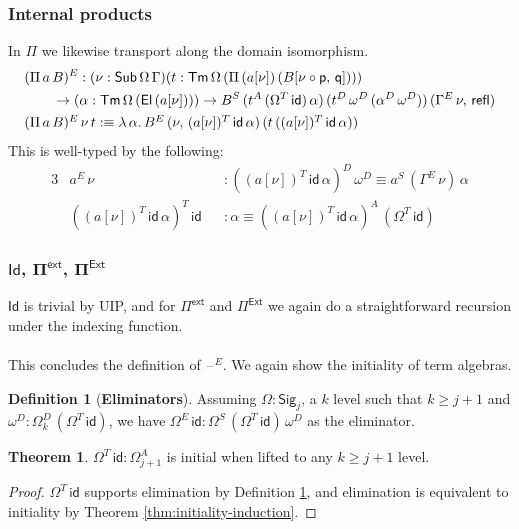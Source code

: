 \documentclass[12pt,a4paper,twoside,openany]{book}
\theoremstyle{remark}
\theoremstyle{definition}
\newtheorem{mydefinition}{Definition}
\theoremstyle{theorem}
\newtheorem{theorem}{Theorem}
\newcommand{\bs}[1]{\boldsymbol{#1}}
\newcommand{\refl}{\mathsf{refl}}
\newcommand{\id}{\mathsf{id}}
\newcommand{\Sub}{\mathsf{Sub}}
\newcommand{\Tm}{\mathsf{Tm}}
\newcommand{\El}{\mathsf{El}}
\newcommand{\Id}{\mathsf{Id}}
\newcommand{\blank}{\mathord{\hspace{1pt}\text{--}\hspace{1pt}}}
\newcommand{\Pie}{\Pi^{\mathsf{Ext}}}
\newcommand{\Piinf}{\Pi^{\mathsf{ext}}}
\newcommand{\Sig}{\mathsf{Sig}}
\newcommand{\p}{\mathsf{p}}
\newcommand{\q}{\mathsf{q}}
\newcommand{\defn}{:\equiv}
\begin{document}
\subsubsection{Internal products}
In $\Pi$ we likewise transport along the domain isomorphism.
\begin{alignat*}{3}
 &(\Pi\,a\,B)^E : (\nu : \Sub\,\Omega\,\Gamma)(t : \Tm\,\Omega\,(\Pi\,(a[\nu])\,(B[\nu\circ\p,\,\q])))\\
 & \hspace{2em}\to (\alpha : \Tm\,\Omega\,(\El\,(a[\nu]))) \to B^S\,(t^A\,(\Omega^T\,\id)\,\alpha)\,(t^D\,\omega^D\,(\alpha^D\,\omega^D))\,(\Gamma^E\,\nu,\,\refl)\\
 &\rlap{$(\Pi\,a\,B)^E\,\nu\,t \defn \lambda\,\alpha.\,B^E\,(\nu,\,(a[\nu])^T\,\id\,\alpha)\,(t\,((a[\nu])^T\,\id\,\alpha))$}
\end{alignat*}
This is well-typed by the following:
\begin{alignat*}{3}
  & a^E\,\nu &&: ((a[\nu])^T\,\id\,\alpha)^D\,\omega^D \equiv a^S\,(\Gamma^E\,\nu)\,\alpha\\
  & ((a[\nu])^T\,\id\,\alpha)^T\,\id &&: \alpha \equiv ((a[\nu])^T\,\id\,\alpha)^A\,(\Omega^T\,\id)
\end{alignat*}

\subsubsection{$\bs{\Id}$, $\bs{\Piinf}$, $\bs{\Pie}$}

$\Id$ is trivial by UIP, and for $\Piinf$ and $\Pie$ we again do a straightforward recursion
under the indexing function.
\\\\
This concludes the definition of $\blank^E$. We again show the initiality of term algebras.

\begin{mydefinition}[\textbf{Eliminators}]
\label{def:iqiit-eliminator}
Assuming $\Omega : \Sig_j$, a $k$ level such that $k \geq j + 1$ and $\omega^D :
\Omega^D_{k}\,(\Omega^T\,\id)$, we have $\Omega^E\,\id : \Omega^S\,(\Omega^T\,\id)\,\omega^D$ as
the eliminator.
\end{mydefinition}

\begin{theorem}
  $\Omega^T\,\id : \Omega^A_{j+1}$ is initial when lifted to any $k \geq j + 1$ level.
\end{theorem}
\begin{proof}
  $\Omega^T\,\id$ supports elimination by Definition
  \ref{def:iqiit-eliminator}, and elimination is equivalent to initiality by
  Theorem \ref{thm:initiality-induction}.
\end{proof}
\end{document}
